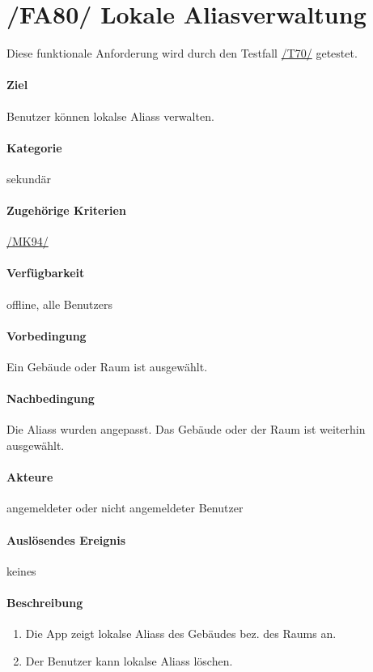 \section[Lokale Aliasverwaltung]{/FA80/ Lokale Aliasverwaltung}
\label{/FA80/}
Diese funktionale Anforderung wird durch den Testfall \hyperref[/T70/]{/T70/} getestet.
\paragraph{Ziel}
\Gls{Benutzer} können \glspl{lokal}e \Glspl{Alias} verwalten.
\paragraph{Kategorie}
sekundär
\paragraph{Zugehörige Kriterien}
\hyperref[/MK94/]{/MK94/}
\paragraph{Verfügbarkeit}
\gls{offline}, alle \Glspl{Benutzer}
\paragraph{Vorbedingung}
Ein Gebäude oder Raum ist ausgewählt.
\paragraph{Nachbedingung}
Die \Glspl{Alias} wurden angepasst. Das Gebäude oder der Raum ist weiterhin ausgewählt.
\paragraph{Akteure}
angemeldeter oder nicht angemeldeter \Gls{Benutzer}
\paragraph{Auslösendes Ereignis} keines
\paragraph{Beschreibung}
\begin{enumerate}
      \item Die App zeigt \glspl{lokal}e \Glspl{Alias} des Gebäudes bez. des Raums an.
      \item Der \Gls{Benutzer} kann \glspl{lokal}e \Glspl{Alias} löschen.
\end{enumerate}